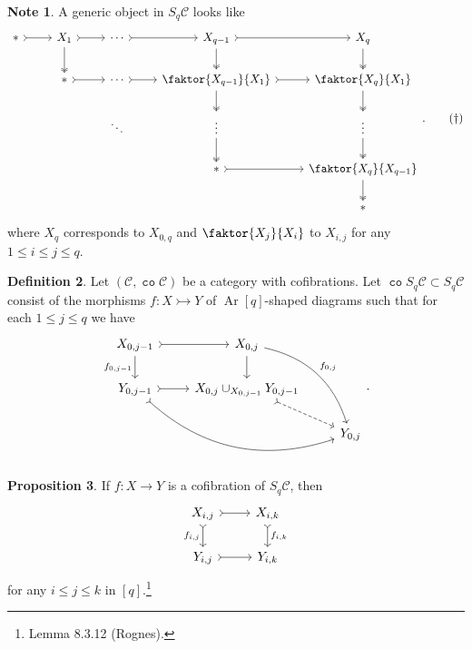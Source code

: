 \documentclass[10pt,letterpaper,cm]{nupset}
\theoremstyle{definition}
\newtheorem{definition}{Definition}
\newtheorem{note}[definition]{Note}
\theoremstyle{theorem}
\newtheorem{prop}[definition]{Proposition}
\theoremstyle{remark}
\newcommand{\1}{\mathbf{1}}
\renewcommand{\c}{\mathscr{C}}
\newcommand{\0}{\vec 0}
\DeclareMathOperator{\co}{\mathtt{co}}
\DeclareMathOperator{\Ar}{Ar}
\begin{document}
\begin{note}\label{note}
A generic object in $S_q\c$ looks like
\[ \label{eqn:D} 
\begin{tikzcd}
\ast \arrow[r, tail] & X_1 \arrow[r, tail] \arrow[d, two heads] & \cdots \arrow[r, tail] & X_{q-1} \arrow[r, tail] \arrow[d, two heads] & X_q \arrow[d, two heads] \\
 & \ast \arrow[r, tail] & \cdots \arrow[r, tail] & \faktor{X_{q-1}}{X_1} \arrow[d, two heads] \arrow[r, tail] & \faktor{X_q}{X_1} \arrow[d, two heads] \\
 &  & \ddots & \vdots \arrow[d, two heads] & \vdots \arrow[d, two heads] \\
 &  &  & \ast \arrow[r, tail] & \faktor{X_q}{X_{q-1}} \arrow[d, two heads] \\
 &  &  &  & \ast
\end{tikzcd}. \tag{$\dagger$}
\] where $X_q$ corresponds to $X_{0, q}$ and $\faktor{X_j}{X_i}$ to $X_{i, j}$ for any $1 \leq i \leq j \leq q$. 
\end{note}

\begin{definition}
Let $\left(\c, \co{\c}\right)$ be a category with cofibrations. Let $\co{S_q}\c \subset S_q \c$ consist of the morphisms $f: X \rightarrowtail Y$ of $\Ar[q]$-shaped diagrams such that for each $1\leq j \leq q$ we have
\[
\begin{tikzcd}
{X_{0, j-1}} \arrow[d, "{f_{0, j-1}}"'] \arrow[r, tail] & {X_{0, j}} \arrow[d] \arrow[rdd, "{f_{0, j}}", bend left] &  \\
{Y_{0, j-1}} \arrow[r, tail] \arrow[rrd, tail, bend right] & {X_{0, j} \cup_{X_{0, j-1}} Y_{0, j-1}} \arrow[rd, dashed, tail] &  \\
 &  & {Y_{0, j}}
\end{tikzcd}.
\]
\end{definition}

\begin{prop}
If $f: X \to Y$ is a cofibration of $S_q\c$, then 
\[
\begin{tikzcd}
{X_{i, j}} \arrow[d, "{f_{i,j}}"', tail] \arrow[r, tail] & {X_{i, k}} \arrow[d, "{f_{i,k}}", tail] \\
{Y_{i, j}} \arrow[r, tail] & {Y_{i,k}}
\end{tikzcd}
\] for any $i \leq j \leq k$ in $[q]$.\footnote{Lemma 8.3.12 (Rognes).}
\end{prop}
\end{document}
